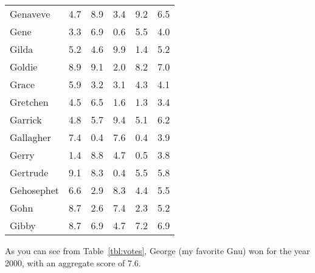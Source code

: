 \begin{center}
\begin{longtable}{lccccc}
    Genaveve & 4.7 & 8.9 & 3.4 & 9.2 & 6.5 \\
    Gene & 3.3 & 6.9 & 0.6 & 5.5 & 4.0 \\
    Gilda & 5.2 & 4.6 & 9.9 & 1.4 & 5.2 \\
    Goldie & 8.9 & 9.1 & 2.0 & 8.2 & 7.0 \\
    Grace & 5.9 & 3.2 & 3.1 & 4.3 & 4.1 \\
    Gretchen & 4.5 & 6.5 & 1.6 & 1.3 & 3.4 \\
    Garrick & 4.8 & 5.7 & 9.4 & 5.1 & 6.2 \\
    Gallagher & 7.4 & 0.4 & 7.6 & 0.4 & 3.9 \\
    Gerry & 1.4 & 8.8 & 4.7 & 0.5 & 3.8 \\
    Gertrude & 9.1 & 8.3 & 0.4 & 5.5 & 5.8 \\
    Gehosephet & 6.6 & 2.9 & 8.3 & 4.4 & 5.5 \\
    Gohn & 8.7 & 2.6 & 7.4 & 2.3 & 5.2 \\
    Gibby & 8.7 & 6.9 & 4.7 & 7.2 & 6.9 \\
  \end{longtable}
\end{center}

As you can see from Table~\ref{tbl:votes}, George (my favorite Gnu)
won for the year 2000, with an aggregate score of 7.6.

%
% 
% 

